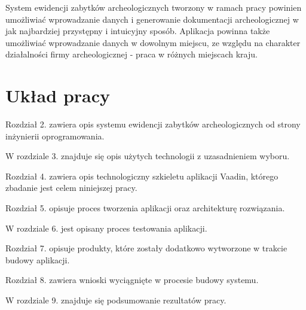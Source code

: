 System ewidencji zabytków archeologicznych tworzony w ramach pracy powinien umożliwiać wprowadzanie danych i generowanie dokumentacji archeologicznej w jak najbardziej przystępny i intuicyjny sposób. Aplikacja powinna także umożliwiać wprowadzanie danych w dowolnym miejscu, ze względu na charakter działalności firmy archeologicznej - praca w różnych miejscach kraju.
\section{Układ pracy}
Rozdział 2. zawiera opis systemu ewidencji zabytków archeologicznych od strony inżynierii oprogramowania.

W rozdziale 3. znajduje się opis użytych technologii z uzasadnieniem wyboru.

Rozdział 4. zawiera opis technologiczny szkieletu aplikacji Vaadin, którego zbadanie jest celem niniejszej pracy.

Rozdział 5. opisuje proces tworzenia aplikacji oraz architekturę rozwiązania.

W rozdziale 6. jest opisany proces testowania aplikacji.

Rozdział 7. opisuje produkty, które zostały dodatkowo wytworzone w trakcie budowy aplikacji.

Rozdział 8. zawiera wnioski wyciągnięte w procesie budowy systemu.

W rozdziale 9. znajduje się podsumowanie rezultatów pracy.

